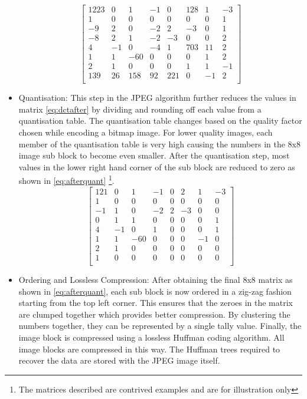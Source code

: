 \begin{itemize}
\begin{equation}
\label{eq:dctafter}
\begin{bmatrix}
1223 & 0 & 1 & -1 & 0 & 128 & 1 & -3 \\
1 & 0 & 0 & 0 & 0 & 0 & 0 & 1 \\
-9 & 2 & 0 & -2 & 2 & -3 & 0 & 1 \\ 
-8 & 2 & 1 & -2 & -3 & 0 & 0 & 2 \\
4 & -1 & 0 & -4 & 1 & 703 & 11 & 2 \\
1 & 1 & -60 & 0 & 0 & 0 & 1 & 2 \\
2 & 1 & 0 & 0 & 0 & 1 & 1 & -1 \\
139 & 26 & 158 & 92 & 221 & 0 & -1 & 2 \\

\end{bmatrix}
\end{equation}
\item{Quantisation}: This step in the JPEG algorithm further reduces the values in matrix \ref{eq:dctafter} by dividing and rounding off each value from a quantisation table. The quantisation table changes based on the quality factor chosen while encoding a bitmap image. For lower quality images, each member of the quantisation table is very high causing the numbers in the 8x8 image sub block to become even smaller. After the quantisation step, most values in the lower right hand corner of the sub block are reduced to zero as shown in \ref{eq:afterquant} \footnote{The matrices described are contrived examples and are for illustration only}.
\begin{equation}
\label{eq:afterquant}
\begin{bmatrix}
121 & 0 & 1 & -1 & 0 & 2 & 1 & -3 \\
1 & 0 & 0 & 0 & 0 & 0 & 0 & 0 \\
-1 & 1 & 0 & -2 & 2 & -3 & 0 & 0 \\ 
0 & 1 & 1 & 0 & 0 & 0 & 0 & 1 \\
4 & -1 & 0 & 1 & 0 & 0 & 0 & 1 \\
1 & 1 & -60 & 0 & 0 & 0 & -1 & 0 \\
2 & 1 & 0 & 0 & 0 & 0 & 0 & 0 \\
1 & 0 & 0 & 0 & 0 & 0 & 0 & 0 \\

\end{bmatrix}
\end{equation}
\item{Ordering and Lossless Compression}: After obtaining the final 8x8 matrix as shown in \ref{eq:afterquant}, each sub block is now ordered in a zig-zag fashion starting from the top left corner. This ensures that the zeroes in the matrix are clumped together which provides better compression. By clustering the numbers together, they can be represented by a single tally value. Finally, the image block is compressed using a lossless Huffman \cite{huffman1952method} coding algorithm. All image blocks are compressed in this way. The Huffman trees required to recover the data are stored with the JPEG image itself.
\end{itemize}
